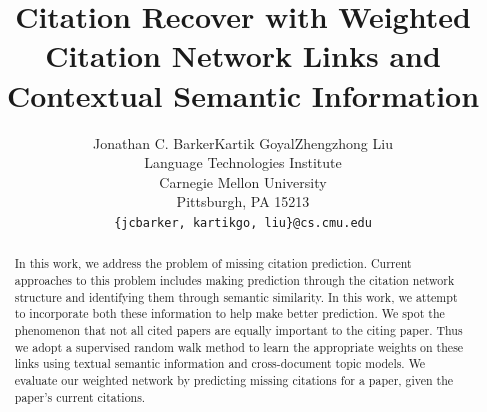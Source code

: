 \documentclass{article} %
\title{Citation Recover with Weighted Citation Network Links and Contextual Semantic Information}
\author{
Jonathan C. Barker\tab Kartik Goyal\tab Zhengzhong Liu \\
Language Technologies Institute \\
Carnegie Mellon University \\
Pittsburgh, PA 15213 \\
\texttt{\{jcbarker, kartikgo, liu\}@cs.cmu.edu} \\
}
\begin{document}
\maketitle

\begin{abstract}
	In this work, we address the problem of missing citation prediction. Current approaches to this problem includes making prediction through the citation network structure and identifying them through semantic similarity. In this work, we attempt to incorporate both these information to help make better prediction. We spot the phenomenon that not all cited papers are equally important to the citing paper. Thus we adopt a supervised random walk method to learn the appropriate weights on these links using textual semantic information and cross-document topic models. We evaluate our weighted network by predicting missing citations for a paper, given the paper's current citations.
\end{abstract}
\end{document}
